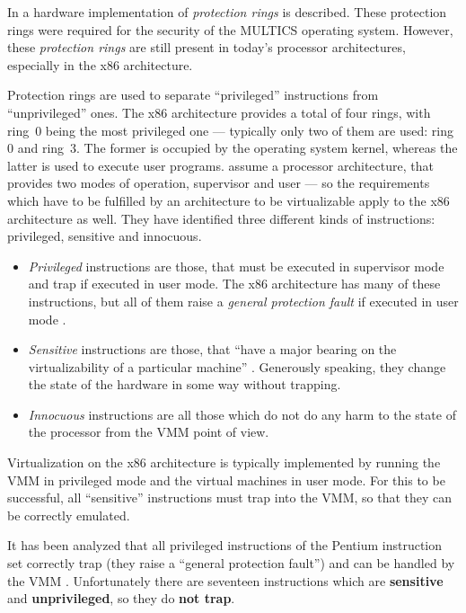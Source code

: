 In \cite{schroeder72} a hardware implementation of \emph{protection rings}
is described.   These protection rings  were required for the  security of
the MULTICS  operating system. However, these  \emph{protection rings} are
still present  in today's processor  architectures, especially in  the x86
architecture.

Protection  rings are  used to  separate ``privileged''  instructions from
``unprivileged''  ones. The  x86  architecture provides  a  total of  four
rings, with ring~$0$ being the  most privileged one --- typically only two
of them  are used: ring~$0$  and ring~$3$. The  former is occupied  by the
operating  system kernel,  whereas  the  latter is  used  to execute  user
programs.  \citet{popek74} assume  a processor architecture, that provides
two modes of operation, supervisor  and user --- so the requirements which
have to be  fulfilled by an architecture to be  virtualizable apply to the
x86 architecture as  well.  They have identified three  different kinds of
instructions: privileged, sensitive and innocuous.

\begin{itemize}
\item \emph{Privileged}  instructions are those, that must  be executed in
  supervisor mode and trap if  executed in user mode. The x86 architecture
  has many  of these instructions, but  all of them  raise a \emph{general
    protection fault} if executed in user mode \cite{robin00analysis}.
  
\item \emph{Sensitive} instructions are those, that ``have a major bearing
  on     the     virtualizability     of    a     particular     machine''
  \cite{popek74}.  Generously  speaking,  they  change the  state  of  the
  hardware in some way without trapping.
  
\item \emph{Innocuous} instructions are all those which do not do any harm
  to the state of the processor from the VMM point of view.
\end{itemize}

Virtualization on the x86 architecture is typically implemented by running
the VMM in privileged mode and the virtual machines in user mode. For this
to  be successful,  all ``sensitive''  instructions \cite{popek74,popek75}
must trap into the VMM, so that they can be correctly emulated.

It  has been  analyzed that  all  privileged instructions  of the  Pentium
instruction  set correctly  trap (\ie  they raise  a  ``general protection
fault'')   and  can   be  handled   by  the   VMM  \cite{robin00analysis}.
Unfortunately    there    are    seventeen    instructions    which    are
\textbf{sensitive}  and  \textbf{unprivileged},  so  they  do  \textbf{not
  trap}.

